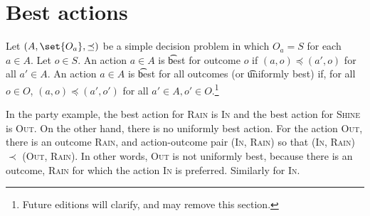 \section*{Best actions}

Let $(A, \set{O_a}, \preceq)$ be a simple decision problem in which $O_a = S$ for each $a \in A$.
Let $o \in S$.
An action $a \in A$ is \t{best for outcome $o$} if $(a, o) \preceq (a', o)$ for all $a' \in A$.
An action $a \in A$ is \t{best for all outcomes} (or \t{uniformly best}) if, for all $o \in O$, $(a, o) \preceq (a', o')$ for all $a' \in A, o' \in O$.\footnote{Future editions will clarify, and may remove this section.}

In the party example, the best action for \textsc{Rain} is \textsc{In} and the best action for \textsc{Shine} is \textsc{Out}.
On the other hand, there is no uniformly best action.
For the action \textsc{Out}, there is an outcome \textsc{Rain}, and action-outcome pair (\textsc{In}, \textsc{Rain}) so that (\textsc{In}, \textsc{Rain}) $\prec$ (\textsc{Out}, \textsc{Rain}).
In other words, \textsc{Out} is not uniformly best, because there is an outcome, \textsc{Rain} for which the action \textsc{In} is preferred.
Similarly for \textsc{In}.
